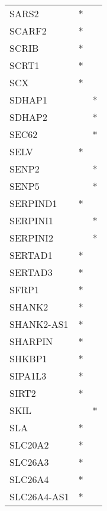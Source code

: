 \begin{longtable}{lcc}
SARS2            &              * &            \\
SCARF2           &              * &            \\
SCRIB            &              * &            \\
SCRT1            &              * &            \\
SCX              &              * &            \\
SDHAP1           &                &          * \\
SDHAP2           &                &          * \\
SEC62            &                &          * \\
SELV             &              * &            \\
SENP2            &                &          * \\
SENP5            &                &          * \\
SERPIND1         &              * &            \\
SERPINI1         &                &          * \\
SERPINI2         &                &          * \\
SERTAD1          &              * &            \\
SERTAD3          &              * &            \\
SFRP1            &              * &            \\
SHANK2           &              * &            \\
SHANK2-AS1       &              * &            \\
SHARPIN          &              * &            \\
SHKBP1           &              * &            \\
SIPA1L3          &              * &            \\
SIRT2            &              * &            \\
SKIL             &                &          * \\
SLA              &              * &            \\
SLC20A2          &              * &            \\
SLC26A3          &              * &            \\
SLC26A4          &              * &            \\
SLC26A4-AS1      &              * &            \\

\end{longtable}
